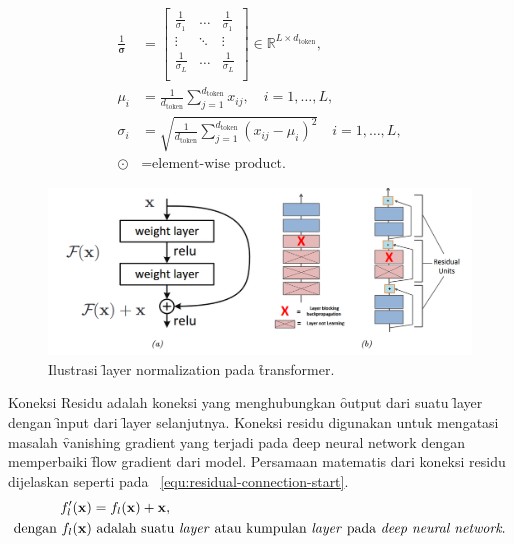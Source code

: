 \begin{align}
		\frac{1}{\bm{\sigma}} &= \begin{bmatrix}
		\frac{1}{\sigma_1} &\dots & \frac{1}{\sigma_1} \\
		\vdots & \ddots &\vdots \\
		\frac{1}{\sigma_L} &\dots & \frac{1}{\sigma_L} \\
		\end{bmatrix} \in \mathbb{R}^{L\times d_{\text{token}}}, \\
		\mu_i &= \frac{1}{d_\text{token}}\sum_{j=1}^{d_{\text{token}}} x_{ij},\quad i=1,\dots,L, \\
		\sigma_i &= \sqrt{\frac{1}{d_{\text{token}}} \sum_{j=1}^{d_{\text{token}}} (x_{ij}-\mu_i)^2}\quad i = 1,\dots, L, \\
		\label{equ:layer-normalization-end}
		\odot &= \text{element-wise product.} 
		\end{align}
	\begin{figure}
			\centering
			\includegraphics[width=1\textwidth]{assets/pics/residual-connection.png}
			\caption{Ilustrasi \f{layer normalization} pada \f{transformer}.}
			\label{fig:residual-connection}
	\end{figure}

	Koneksi Residu adalah koneksi yang menghubungkan \f{output} dari suatu \f{layer} dengan \f{input} dari \f{layer} selanjutnya. Koneksi residu digunakan untuk mengatasi masalah \f{vanishing gradient} yang terjadi pada \f{deep neural network} dengan memperbaiki \f{flow gradient} dari model. Persamaan matematis dari koneksi residu dijelaskan seperti pada \equ~\ref{equ:residual-connection-start}.
	\begin{align}
		\label{equ:residual-connection-start}
		f_l'(\mathbf{x}) &= f_l(\mathbf{x}) + \mathbf{x}, \\
		\text{dengan } f_l(\mathbf{x}) &\text{ adalah suatu \textit{layer} atau kumpulan \textit{layer} pada \textit{deep neural network}.}
	\end{align}

